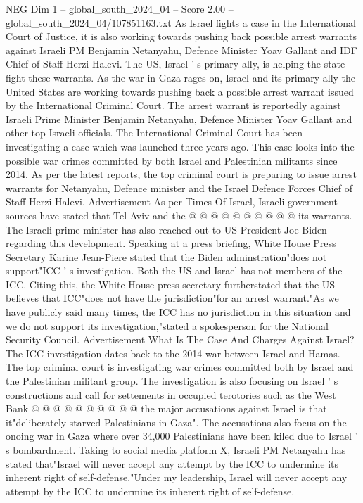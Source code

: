 \begin{textsample}{NEG Dim 1 – global\_south\_2024\_04 – Score 2.00 – global\_south\_2024\_04/107851163.txt}  \label{ex:f1_neg_308}
As Israel fights a case in the International Court of Justice, it is also working towards pushing back possible arrest warrants against Israeli PM Benjamin Netanyahu, Defence Minister Yoav Gallant and IDF Chief of Staff Herzi Halevi.
The US, Israel ' s primary ally, is helping the state fight these warrants.
As the war in Gaza rages on, Israel and its primary ally the United States are working towards pushing back a possible arrest warrant issued by the International Criminal Court.
The arrest warrant is reportedly against Israeli Prime Minister Benjamin Netanyahu, Defence Minister Yoav Gallant and other top Israeli officials.
The International Criminal Court has been investigating a case which was launched three years ago.
This case looks into the possible war crimes committed by both Israel and Palestinian militants since 2014.
As per the latest reports, the top criminal court is preparing to issue arrest warrants for Netanyahu, Defence minister and the Israel Defence Forces Chief of Staff Herzi Halevi.
Advertisement As per Times Of Israel, Israeli government sources have stated that Tel Aviv and the @ @ @ @ @ @ @ @ @ @ its warrants.
The Israeli prime minister has also reached out to US President Joe Biden regarding this development.
Speaking at a press briefing, White House Press Secretary Karine Jean-Piere stated that the Biden adminstration"does not support"ICC ' s investigation.
Both the US and Israel has not members of the ICC.
Citing this, the White House press secretary furtherstated that the US believes that ICC"does not have the jurisdiction"for an arrest warrant."As we have publicly said many times, the ICC has no jurisdiction in this situation and we do not support its investigation,"stated a spokesperson for the National Security Council.
Advertisement What Is The Case And Charges Against Israel?
The ICC investigation dates back to the 2014 war between Israel and Hamas.
The top criminal court is investigating war crimes committed both by Israel and the Palestinian militant group.
The investigation is also focusing on Israel ' s constructions and call for settements in occupied terotories such as the West Bank @ @ @ @ @ @ @ @ @ @ the major accusations against Israel is that it"deliberately starved Palestinians in Gaza".
The accusations also focus on the onoing war in Gaza where over 34,000 Palestinians have been kiled due to Israel ' s bombardment.
Taking to social media platform X, Israeli PM Netanyahu has stated that"Israel will never accept any attempt by the ICC to undermine its inherent right of self-defense."Under my leadership, Israel will never accept any attempt by the ICC to undermine its inherent right of self-defense.

\end{textsample}
